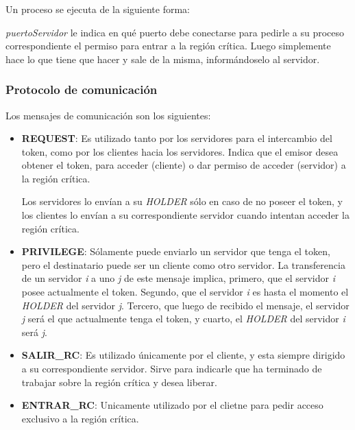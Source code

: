 \subsubsection{}

Un proceso  se ejecuta de la siguiente forma:


\emph{puertoServidor} le indica en qué puerto debe conectarse para pedirle a su
proceso  correspondiente el permiso para entrar a la región
crítica. Luego simplemente hace lo que tiene que hacer y sale de la misma,
informándoselo al servidor.


\subsubsection{Protocolo de comunicación}

Los mensajes de comunicación son los siguientes:

\begin{itemize}

\item \textbf{REQUEST}: Es utilizado tanto por los servidores para el
intercambio del token, como por los clientes hacia los servidores. Indica que
el emisor desea obtener el token, para acceder (cliente) o dar permiso de
acceder (servidor) a la región crítica.

Los servidores lo envían a su \emph{HOLDER} sólo en caso de no poseer el token,
y los clientes lo envían a su correspondiente servidor cuando intentan acceder
la región crítica.

\item \textbf{PRIVILEGE}: Sólamente puede enviarlo un servidor que tenga el
token, pero el destinatario puede ser un cliente como otro servidor. La
transferencia de un servidor \textsl{i} a uno \textsl{j} de este mensaje
implica, primero, que el servidor \textsl{i} posee actualmente el token.
Segundo, que el servidor \textsl{i} es hasta el momento el \emph{HOLDER} del
servidor \textsl{j}. Tercero, que luego de recibido el mensaje, el servidor
\textsl{j} será el que actualmente tenga el token, y cuarto, el \emph{HOLDER}
del servidor \textsl{i} será \textsl{j}.

\item \textbf{SALIR_RC}: Es utilizado únicamente por el cliente, y esta siempre
dirigido a su correspondiente servidor. Sirve para indicarle que ha terminado
de trabajar sobre la región crítica y desea liberar.

\item \textbf{ENTRAR_RC}: Unicamente utilizado por el clietne para pedir
acceso exclusivo a la región crítica.

\end{itemize}

